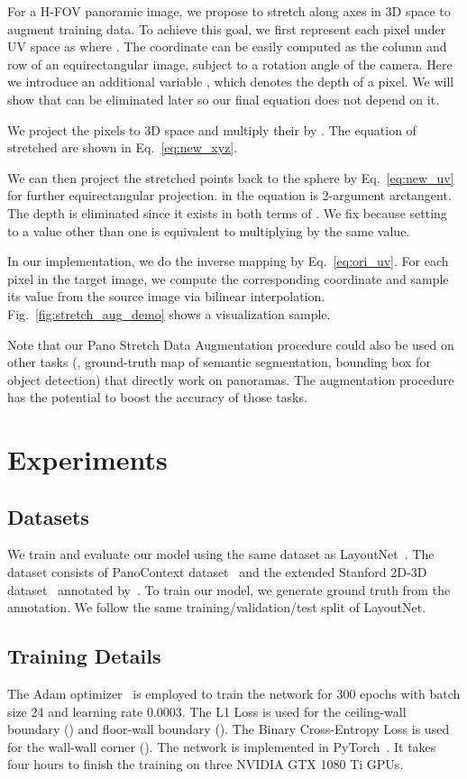 \documentclass[10pt,twocolumn,letterpaper]{article}
\newcommand{\threesixty}{\text{360}\xspace}
\begin{document}
For a \threesixty H-FOV panoramic image, we propose to stretch along axes in 3D space to augment training data. To achieve this goal, we first represent each pixel under UV space as  where . The coordinate  can be easily computed as the column and row of an equirectangular image, subject to a rotation angle of the camera. Here we introduce an additional variable , which denotes the depth of a pixel. We will show that  can be eliminated later so our final equation does not depend on it.

We project the pixels to 3D space and multiply their  by . The equation of stretched  are shown in Eq.~\ref{eq:new_xyz}.


We can then project the stretched points back to the sphere by Eq.~\ref{eq:new_uv} for further equirectangular projection.  in the equation is 2-argument arctangent. The depth  is eliminated since it exists in both terms of . We fix  because setting  to a value other than one is equivalent to multiplying  by the same value. 


In our implementation, we do the inverse mapping by Eq.~\ref{eq:ori_uv}. For each pixel in the target image, we compute the corresponding coordinate and sample its value from the source image via bilinear interpolation. Fig.~\ref{fig:stretch_aug_demo} shows a visualization sample.

Note that our Pano Stretch Data Augmentation procedure could also be used on other tasks (\eg, ground-truth map of semantic segmentation, bounding box for object detection) that directly work on panoramas. The augmentation procedure has the potential to boost the accuracy of those tasks.
  
\section{Experiments}\label{sssec:exp}

\subsection{Datasets}
We train and evaluate our model using the same dataset as LayoutNet~\cite{zou2018layoutnet}.
The dataset consists of PanoContext dataset~\cite{zhang2014panocontext} and the extended Stanford 2D-3D dataset~\cite{2017arXiv170201105A} annotated by~\cite{zou2018layoutnet}.
To train our model, we generate  ground truth from the annotation.
We follow the same training/validation/test split of LayoutNet.

\subsection{Training Details}
The Adam optimizer~\cite{adam} is employed to train the network for 300 epochs with batch size 24 and learning rate 0.0003.
The L1 Loss is used for the ceiling-wall boundary () and floor-wall boundary ().
The Binary Cross-Entropy Loss is used for the wall-wall corner ().
The network is implemented in PyTorch~\cite{paszke2017automatic}.
It takes four hours to finish the training on three NVIDIA GTX 1080 Ti GPUs.
\end{document}
